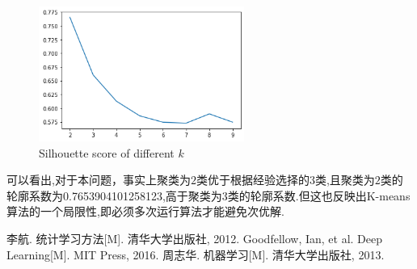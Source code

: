 \documentclass[UTF8,a4paper,11pt]{ctexart}
\begin{document}
	\begin{figure}[H]
	\centering
	\includegraphics[width=0.6\textwidth,height=0.45\textwidth]{score.png}
	\caption{Silhouette score of different $k$}
\end{figure}
可以看出,对于本问题，事实上聚类为$2$类优于根据经验选择的$3$类,且聚类为$2$类的轮廓系数为0.7653904101258123,高于聚类为$3$类的轮廓系数.但这也反映出K-means算法的一个局限性,即必须多次运行算法才能避免次优解.
\newpage
\begin{thebibliography}{3}  
	 李航. 统计学习方法[M]. 清华大学出版社, 2012.
	 Goodfellow, Ian, et al. Deep Learning[M]. MIT Press, 2016. 	
	 周志华. 机器学习[M]. 清华大学出版社, 2013.
\end{thebibliography}
\end{document}
